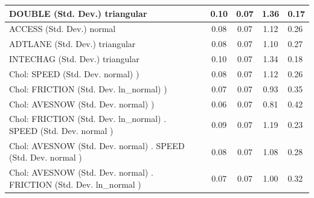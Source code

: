 \begin{table}
\begin{center}
\begin{tabular}{|l|l|c|c|c|l|}
			\hline
			DOUBLE (Std. Dev.) triangular &  & 0.10 & 0.07 & 1.36 & 0.17 \\
			\hline
			ACCESS (Std. Dev.) normal &  & 0.08 & 0.07 & 1.12 & 0.26 \\
			\hline
			ADTLANE (Std. Dev.) triangular &  & 0.08 & 0.07 & 1.10 & 0.27 \\
			\hline
			INTECHAG (Std. Dev.) triangular &  & 0.10 & 0.07 & 1.34 & 0.18 \\
			\hline
			 Chol: SPEED (Std. Dev. normal) ) &  & 0.08 & 0.07 & 1.12 & 0.26 \\
			\hline
			 Chol: FRICTION (Std. Dev. ln_normal) ) &  & 0.07 & 0.07 & 0.93 & 0.35 \\
			\hline
			 Chol: AVESNOW (Std. Dev. normal) ) &  & 0.06 & 0.07 & 0.81 & 0.42 \\
			\hline
			 Chol: FRICTION (Std. Dev. ln_normal) . SPEED (Std. Dev.   normal ) &  & 0.09 & 0.07 & 1.19 & 0.23 \\
			\hline
			 Chol: AVESNOW (Std. Dev. normal) . SPEED (Std. Dev.   normal ) &  & 0.08 & 0.07 & 1.08 & 0.28 \\
			\hline
			 Chol: AVESNOW (Std. Dev. normal) . FRICTION (Std. Dev.   ln_normal ) &  & 0.07 & 0.07 & 1.00 & 0.32 \\
			\hline
		\end{tabular}
	\end{center}
\end{table}